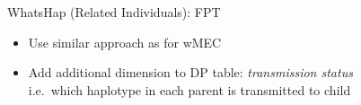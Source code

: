 \documentclass[notes=hide]{beamer}
\begin{document}

\begin{frame}

		\begin{block}{WhatsHap (Related Individuals): \color{red} FPT }
			\begin{itemize}
				\item Use similar approach as for wMEC
				\item Add additional dimension to DP table: \emph{transmission status}\\
				i.e.\ which haplotype in each parent is transmitted to child
			\end{itemize}
		\end{block}
\end{frame}
\end{document}

